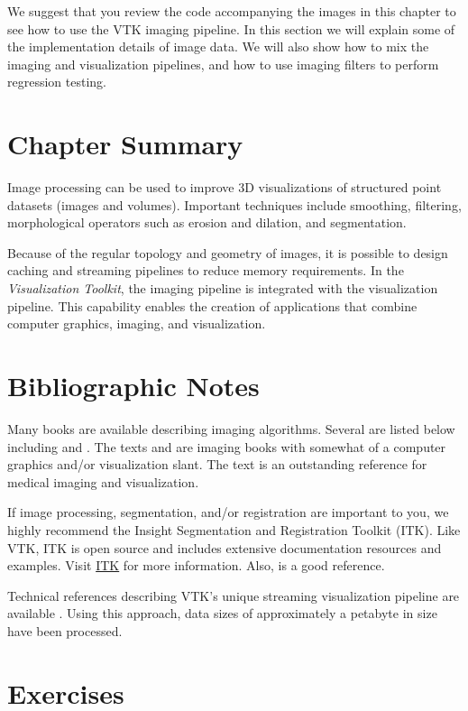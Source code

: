 We suggest that you review the code accompanying the images in this chapter to see how to use the VTK imaging pipeline. In this section we will explain some of the implementation details of image data. We will also show how to mix the imaging and visualization pipelines, and how to use imaging filters to perform regression testing.

\section{Chapter Summary}

Image processing can be used to improve 3D visualizations of structured point datasets (images and volumes). Important techniques include smoothing, filtering, morphological operators such as erosion and dilation, and segmentation.

Because of the regular topology and geometry of images, it is possible to design caching and streaming pipelines to reduce memory requirements. In the \emph{Visualization Toolkit}, the imaging pipeline is integrated with the visualization pipeline. This capability enables the creation of applications that combine computer graphics, imaging, and visualization.

\section{Bibliographic Notes}

Many books are available describing imaging algorithms. Several are listed below including \cite{Gonzalez92} and \cite{Russ95}. The texts \cite{Pavlidis82} and \cite{Wolberg90} are imaging books with somewhat of a computer graphics and/or visualization slant. The text \cite{Robb95} is an outstanding reference for medical imaging and visualization.

If image processing, segmentation, and/or registration are important to you, we highly recommend the Insight Segmentation and Registration Toolkit (ITK). Like VTK, ITK is open source and includes extensive documentation resources and examples. Visit \href{https://itk.org/}{ITK} for more information. Also, \cite{Ibanez03} is a good reference.

Technical references describing VTK’s unique streaming visualization pipeline are available \cite{Law99} \cite{Martin01}. Using this approach, data sizes of approximately a petabyte in size have been processed.


\printbibliography

\section{Exercises}

